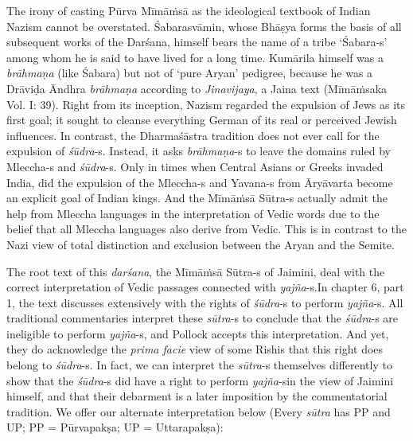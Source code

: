 The irony of casting Pūrva Mīmāṁsā as the ideological textbook of Indian Nazism cannot be overstated. Śabarasvāmin, whose Bhāṣya forms the basis of all subsequent works of the Darśana, himself bears the name of a tribe ‘Śabara-s’ among whom he is said to have lived for a long time. Kumārila himself was a \textit{brāhmaṇa} (like Śabara) but not of ‘pure Aryan’ pedigree, because he was a Drāviḍa Āndhra \textit{brāhmaṇa} according to \textit{Jinavijaya}, a Jaina text (Mīmāṁsaka Vol. I: 39). Right from its inception, Nazism regarded the expulsion of Jews as its first goal; it sought to cleanse everything German of its real or perceived Jewish influences. In contrast, the Dharmaśāstra tradition does not ever call for the expulsion of \textit{śūdra}-s. Instead, it asks \textit{brāhmaṇa}-s to leave the domains ruled by Mleccha-s and \textit{śūdra}-s. Only in times when Central Asians or Greeks invaded India, did the expulsion of the Mleccha-s and Yavana-s from Āryāvarta become an explicit goal of Indian kings. And the Mīmāṁsā Sūtra-s actually admit the help from Mleccha languages in the interpretation of Vedic words due to the belief that all Mleccha languages also derive from Vedic. This is in contrast to the Nazi view of total distinction and exclusion between the Aryan and the Semite.

The root text of this \textit{darśana}, the Mīmāṁsā Sūtra-s of Jaimini, deal with the correct interpretation of Vedic passages connected with \textit{yajña}-s.\break In chapter 6, part 1, the text discusses extensively with the rights of \textit{śūdra}-s to perform \textit{yajña}-s. All traditional commentaries interpret these \textit{sūtra}-s to conclude that the \textit{śūdra}-s are ineligible to perform \textit{yajña}-s, and Pollock accepts this interpretation. And yet, they do acknowledge the \textit{prima facie} view of some Rishis that this right does belong to \textit{śūdra}-s. In fact, we can interpret the \textit{sūtra}-s themselves differently to show that the \textit{śūdra}-s did have a right to perform \textit{yajña}-s\break in the view of Jaimini himself, and that their debarment is a later imposition by the commentatorial tradition. We offer our alternate interpretation below (Every \textit{sūtra} has PP and UP; PP = Pūrvapakṣa; UP = Uttarapakṣa):

